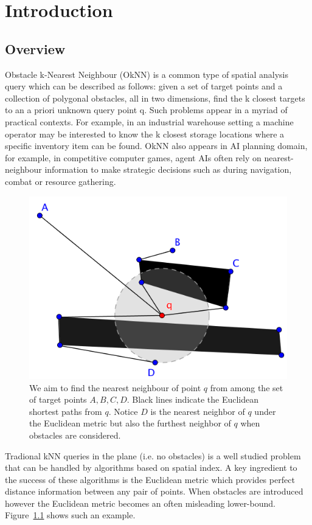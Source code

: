 \chapter{Introduction}
\section{Overview}
Obstacle k-Nearest Neighbour (OkNN) is a common type
of spatial analysis query which can be described as follows:
given a set of target points and a collection of polygonal obstacles,
all in two dimensions, find the k closest targets to
an a priori unknown query point q. Such problems appear
in a myriad of practical contexts. For example, in an industrial
warehouse setting a machine operator may be interested
to know the k closest storage locations where a specific inventory
item can be found. OkNN also appears in AI planning domain, for example,
in competitive computer games, agent AIs often rely on nearest-neighbour information
to make strategic decisions such as during navigation,
combat or resource gathering.

\begin{figure}[htp]
  \centering
  \includegraphics[width=.7\linewidth]{./pic/obs_dis.png}
  \caption{\small
  We aim to find the nearest neighbour of point $q$ from among the set of target points $A,B,C,D$.
  Black lines indicate the Euclidean shortest paths from $q$.
  Notice $D$ is the nearest neighbor of $q$ under the Euclidean metric
  but also the furthest neighbor of $q$ when obstacles are considered.}
\label{obs_dis}
\end{figure}

Tradional kNN queries in the plane (i.e. no obstacles) is a well studied problem that can be
handled by algorithms based on spatial index. A key ingredient to the success of
these algorithms is the Euclidean metric which provides perfect distance information between
any pair of points. When obstacles are introduced however the Euclidean metric becomes an often
misleading lower-bound. Figure~\ref{obs_dis} shows such an example.

